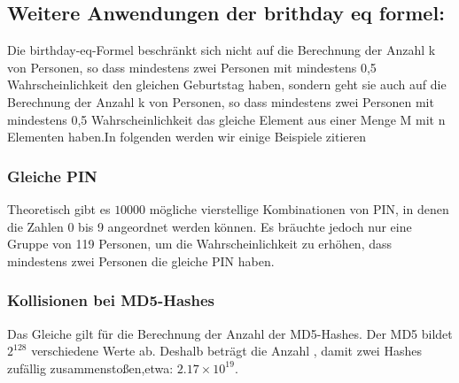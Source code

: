\documentclass[course=erap]{aspdoc}
\begin{document}
\subsection{Weitere Anwendungen der brithday eq formel:}
Die birthday-eq-Formel beschränkt sich nicht auf die Berechnung der Anzahl k von Personen,
so dass mindestens zwei Personen mit mindestens 0,5 Wahrscheinlichkeit den gleichen Geburtstag haben, sondern
geht sie auch  auf die Berechnung der Anzahl k von Personen, so dass mindestens zwei Personen mit mindestens 0,5
Wahrscheinlichkeit das gleiche Element aus einer Menge M mit n Elementen haben.In folgenden werden wir einige Beispiele zitieren
\subsubsection{Gleiche PIN}
Theoretisch gibt es $10000$ mögliche vierstellige Kombinationen von PIN,
in denen die Zahlen 0 bis 9 angeordnet werden können. Es bräuchte jedoch nur eine Gruppe von 119 Personen,
um die Wahrscheinlichkeit zu erhöhen, dass mindestens zwei Personen die gleiche PIN haben.
\subsubsection{Kollisionen bei MD5-Hashes}
Das Gleiche gilt für die Berechnung der Anzahl der MD5-Hashes. Der MD5 bildet $2^{128}$ verschiedene Werte ab.
Deshalb beträgt die Anzahl , damit zwei Hashes zufällig zusammenstoßen,etwa: $2.17\times 10^{19}$.
\end{document}
